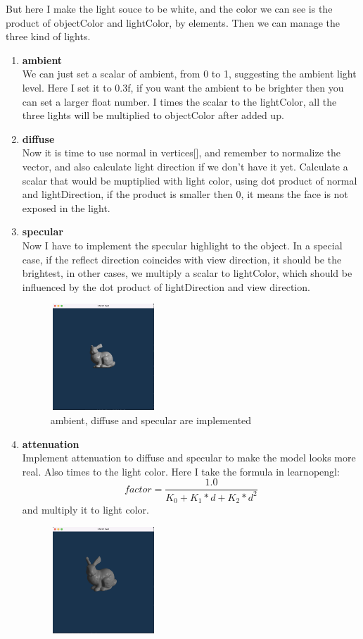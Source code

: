 \documentclass[acmtog]{acmart}
\begin{document}
\begin{enumerate}
	But here I make the light souce to be white, and the color we can see is the product of objectColor and lightColor, by elements. Then we can manage the three kind of lights.
	\begin{enumerate}
		\item \textbf{ambient}\\
		We can just set a scalar of ambient, from 0 to 1, suggesting the ambient light level. Here I set it to 0.3f, if you want the ambient to be brighter then you can set a larger float number. I times the scalar to the lightColor, all the three lights will be multiplied to objectColor after added up.
		\item \textbf{diffuse}\\
		Now it is time to use normal in vertices[], and remember to normalize the vector, and also calculate light direction if we don't have it yet. Calculate a scalar that would be muptiplied with light color, using dot product of normal and lightDirection, if the product is smaller then 0, it means the face is not exposed in the light.
		\item \textbf{specular}\\
		Now I have to implement the specular highlight to the object. In a special case, if the reflect direction coincides with view direction, it should be the brightest, in other cases, we multiply a scalar to lightColor, which should be influenced by the dot product of lightDirection and view direction.
		\begin{figure}[h]
			\includegraphics[width=4cm,height=4cm]{bunny_specular.png}
			\caption{ambient, diffuse and specular are implemented}
			\end{figure}
		\item \textbf{attenuation}\\
		Implement attenuation to diffuse and specular to make the model looks more real. Also times to the light color. Here I take the formula in learnopengl:
		$$factor = \frac{1.0}{K_0+K_1*d+K_2*d^2}$$ and multiply it to light color.
		\begin{figure}[h]
			\includegraphics[width=4cm,height=4cm]{bunny_attenuation.png}

\end{figure}
\end{enumerate}
\end{enumerate}
\end{document}
